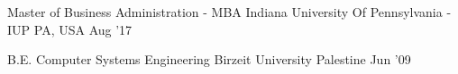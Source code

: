 
\begin{cventries}

  \cventrywide
    {Master of Business Administration - MBA} %
    {Indiana University Of Pennsylvania - IUP} %
    {PA, USA} %
    {Aug '17} %
    {}

  \vspace{1mm}
  \cventrywide
    {B.E. Computer Systems Engineering} %
    {Birzeit University} %
    {Palestine} %
    {Jun '09} %
    {}

\end{cventries}
